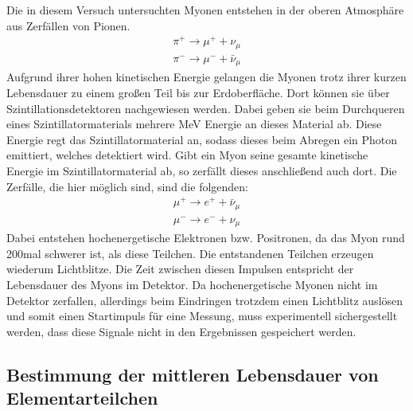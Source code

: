 Die in diesem Versuch untersuchten Myonen entstehen in der oberen Atmosphäre aus
Zerfällen von Pionen.
%
\begin{align}
  \pi^+\rightarrow\mu^++\nu_\mu \\
  \pi^-\rightarrow\mu^-+\bar{\nu}_\mu
\end{align}
%
Aufgrund ihrer hohen kinetischen Energie gelangen die Myonen trotz ihrer kurzen
Lebensdauer zu einem großen Teil bis zur Erdoberfläche. Dort können sie über
Szintillationsdetektoren nachgewiesen werden. Dabei geben sie beim Durchqueren
eines Szintillatormaterials mehrere MeV Energie an dieses Material ab. Diese
Energie regt das Szintillatormaterial an, sodass dieses beim Abregen ein Photon
emittiert, welches detektiert wird. Gibt ein Myon seine gesamte kinetische
Energie im Szintillatormaterial ab, so zerfällt dieses anschließend auch dort.
Die Zerfälle, die hier möglich sind, sind die folgenden:
%
\begin{align}
  \mu^+\rightarrow e^++\bar{\nu}_\mu \\
  \mu^-\rightarrow e^-+\nu_\mu
\end{align}
%
Dabei entstehen hochenergetische Elektronen bzw. Positronen, da das Myon rund
200mal schwerer ist, als diese Teilchen. Die entstandenen Teilchen erzeugen
wiederum Lichtblitze. Die Zeit zwischen diesen Impulsen entspricht der
Lebensdauer des Myons im Detektor. Da hochenergetische Myonen nicht im Detektor
zerfallen, allerdings beim Eindringen trotzdem einen Lichtblitz auslösen und
somit einen Startimpuls für eine Messung, muss experimentell sichergestellt
werden, dass diese Signale nicht in den Ergebnissen gespeichert werden.

\subsection{Bestimmung der mittleren Lebensdauer von Elementarteilchen}

